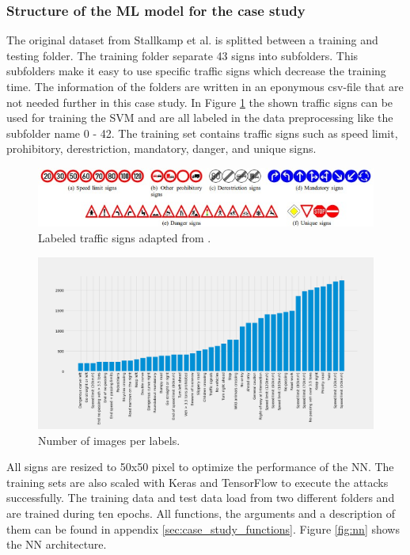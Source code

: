 \subsubsection*{Structure of the ML model for the case study}

The original dataset from Stallkamp et al. \cite{DBLP:conf/ijcnn/StallkampSSI11} is splitted between a training and testing folder. The training folder separate 43 signs into subfolders. This subfolders make it easy to use specific traffic signs which decrease the training time. The information of the folders are written in an eponymous csv-file that are not needed further in this case study. In Figure \ref{fig:traffic_signs} the shown traffic signs can be used for training the SVM and are all labeled in the data preprocessing like the subfolder name 0 - 42. The training set contains traffic signs such as speed limit, prohibitory, derestriction, mandatory, danger, and unique signs.

\begin{figure}[h!]
  \centering
  \includegraphics[width=12cm]{pictures/traffic_signs.jpg}
  \caption{Labeled traffic signs adapted from \cite{DBLP:conf/ijcnn/StallkampSSI11}.}
  \label{fig:traffic_signs}
\end{figure}

\begin{figure}[h!]
  \centering
  \includegraphics[width=15cm]{pictures/num_of_images.png}
  \caption{Number of images per labels.}
  \label{fig:num_of_images}
\end{figure}

All signs are resized to 50x50 pixel to optimize the performance of the NN. The training sets are also scaled with Keras and TensorFlow to execute the attacks successfully. The training data and test data load from two different folders and are trained during ten epochs. All functions, the arguments and a description of them can be found in appendix \ref{sec:case_study_functions}. Figure \ref{fig:nn} shows the NN architecture.

